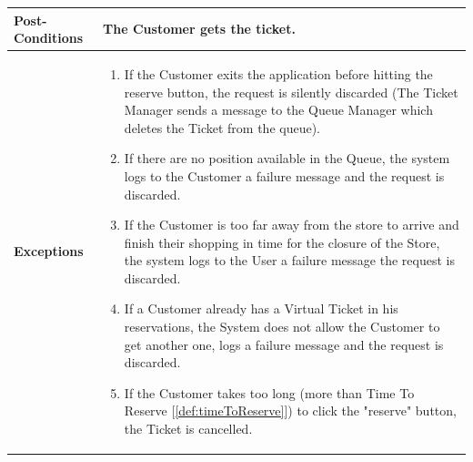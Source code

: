 \documentclass[a4paper, 12pt, oneside]{article}
\begin{document}
\begin{enumerate}[labelindent=20pt, label={UC.\arabic*}, itemindent=1em,leftmargin=!]
\begin{tabularx}{\linewidth}{| l | X |}
	\hline
	\textbf{Post-Conditions} & The Customer gets the ticket.\\
	
	\hline
	\textbf{Exceptions} & \parbox{0.7\textwidth}{ \begin{enumerate}
			\item If the Customer exits the application before hitting the reserve button, the request is silently discarded (The Ticket Manager sends a message to the Queue Manager which deletes the Ticket from the queue).
			\item If there are no position available in the Queue, the system logs to the Customer a failure message and the request is discarded.
			\item If the Customer is too far away from the store to arrive and finish their shopping in time for the closure of the Store, the system logs to the User a failure message the request is discarded.
			\item If a Customer already has a Virtual Ticket in his reservations, the System does not allow the Customer to get another one, logs a failure message and the request is discarded.
			\item If the Customer takes too long (more than Time To Reserve [\ref{def:timeToReserve}]) to click the "reserve" button, the Ticket is cancelled.
		\end{enumerate}}\\

	\hline
	
\end{tabularx}


\end{enumerate}
\end{document}
